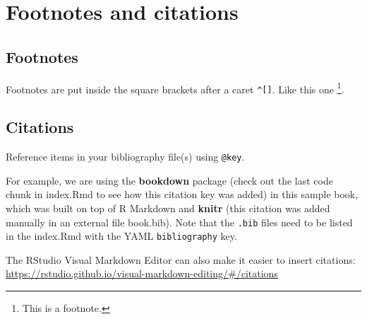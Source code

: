 \documentclass[
]{book}
\begin{document}
\hypertarget{footnotes-and-citations}{%
\chapter{Footnotes and citations}\label{footnotes-and-citations}}

\hypertarget{footnotes}{%
\section{Footnotes}\label{footnotes}}

Footnotes are put inside the square brackets after a caret \texttt{\^{}{[}{]}}. Like this one \footnote{This is a footnote.}.

\hypertarget{citations}{%
\section{Citations}\label{citations}}

Reference items in your bibliography file(s) using \texttt{@key}.

For example, we are using the \textbf{bookdown} package \citep{R-bookdown} (check out the last code chunk in index.Rmd to see how this citation key was added) in this sample book, which was built on top of R Markdown and \textbf{knitr} \citep{xie2015} (this citation was added manually in an external file book.bib).
Note that the \texttt{.bib} files need to be listed in the index.Rmd with the YAML \texttt{bibliography} key.

The RStudio Visual Markdown Editor can also make it easier to insert citations: \url{https://rstudio.github.io/visual-markdown-editing/\#/citations}

  
\end{document}
